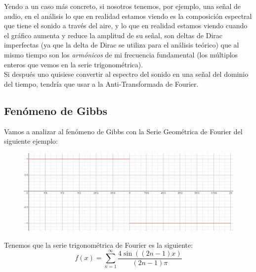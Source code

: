 \documentclass[../main.tex]{subfiles}
\begin{document}
	Yendo a un caso más concreto, si nosotros tenemos, por ejemplo, una
	señal de audio, en el análisis lo que en realidad estamos viendo es la
	composición espectral que tiene el sonido a través del aire, y lo que en
	realidad estamos viendo cuando el gráfico aumenta y reduce la amplitud
	de su señal, son deltas de Dirac imperfectas (ya que la delta de Dirac
	se utiliza para el análisis teórico) que al mismo tiempo son los
	\emph{armónicos} de mi frecuencia fundamental (los múltiplos enteros que
	vemos en la serie trigonométrica).\\
	Si después uno quisiese convertir al espectro del sonido en una señal
	del dominio del tiempo, tendría que usar a la Anti-Transformada de
	Fourier.

\subsection{Fenómeno de Gibbs}

	Vamos a analizar al fenómeno de Gibbs con la Serie Geométrica de Fourier
	del siguiente ejemplo:
\begin{figure}[H]
	\includegraphics[width=\textwidth]{fourier/volpa/image4.png}
\end{figure}
	Tenemos que la serie trigonométrica de Fourier es la siguiente:
	\[
		f(x) = \sum_{n = 1}^{\infty} 
		\dfrac
			{4\sin((2n-1)x)}
			{(2n-1)\pi}
	\]
\end{document}

